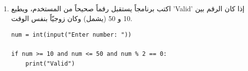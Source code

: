 \documentclass[14pt]{extarticle}
\begin{document}
\begin{enumerate}[itemsep=3em]
\item
اكتب برنامجاً يستقبل رقماً صحيحاً من المستخدم، ويطبع '\textenglish{Valid}' إذا كان الرقم بين 10 و 50 (يشمل) وكان زوجيّاً بنفس الوقت.

\ifwithsols
\begin{boxSolution}
\begin{english}
\begin{verbatim}
num = int(input("Enter number: "))

if num >= 10 and num <= 50 and num % 2 == 0:
    print("Valid")
\end{verbatim}
\end{english}
\end{boxSolution}
\fi

\end{enumerate}
\clearpage
\end{document}
